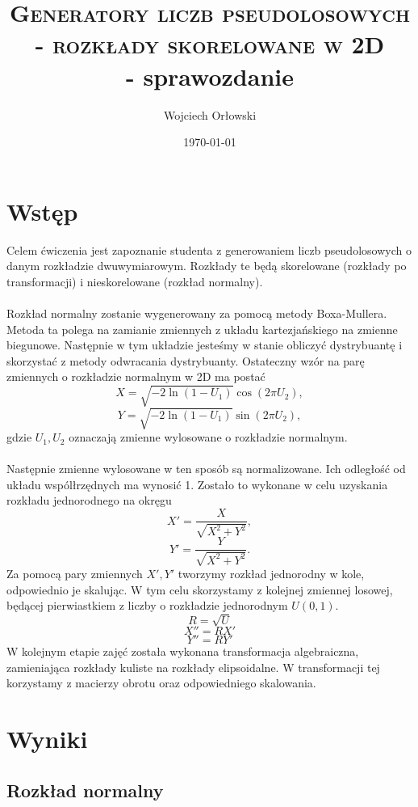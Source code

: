\documentclass[a4paper, 12pt]{article}
\title{\textsc{Generatory liczb pseudolosowych - rozkłady skorelowane w 2D}\\ - sprawozdanie}
\author{Wojciech Orłowski}
\date{\today}
\begin{document}
    \maketitle

    \section{Wstęp}

    Celem ćwiczenia jest zapoznanie studenta z generowaniem liczb pseudolosowych o danym rozkładzie dwuwymiarowym.
    Rozkłady te będą skorelowane (rozkłady po transformacji) i nieskorelowane (rozkład normalny).
    \\
    \\
    Rozkład normalny zostanie wygenerowany za pomocą metody Boxa-Mullera.
    Metoda ta polega na zamianie zmiennych z układu kartezjańskiego na zmienne biegunowe.
    Następnie w tym układzie jesteśmy w stanie obliczyć dystrybuantę i skorzystać z metody odwracania dystrybuanty.
    Ostateczny wzór na parę zmiennych o rozkładzie normalnym w 2D ma postać
    \[ X = \sqrt{-2 \ln(1 - U_1)}\cos(2\pi U_2), \]  
    \[ Y = \sqrt{-2 \ln(1 - U_1)}\sin(2\pi U_2), \]
    gdzie $U_1, U_2$ oznaczają zmienne wylosowane o rozkładzie normalnym.
    \\
    \\
    Następnie zmienne wylosowane w ten sposób są normalizowane.
    Ich odległość od układu wspólłrzędnych ma wynosić 1.
    Zostało to wykonane w celu uzyskania rozkładu jednorodnego na okręgu
    \[ X' = \frac{X}{\sqrt{X^2 + Y^2}},\]
    \[ Y' = \frac{Y}{\sqrt{X^2 + Y^2}}.\] 
    Za pomocą pary zmiennych $X', Y'$ tworzymy rozkład jednorodny w kole, odpowiednio je skalując.
    W tym celu skorzystamy z kolejnej zmiennej losowej, będącej pierwiastkiem z liczby o rozkładzie jednorodnym $U(0,1)$.
    \[ R = \sqrt{U}\] 
    \[ X'' = RX' \]
    \[ Y'' = RY' \]
    W kolejnym etapie zajęć została wykonana transformacja algebraiczna, zamieniająca rozkłady kuliste na rozkłady elipsoidalne.
    W transformacji tej korzystamy z macierzy obrotu oraz odpowiedniego skalowania.

    \section{Wyniki}

    \subsection*{Rozkład normalny}
\end{document}
